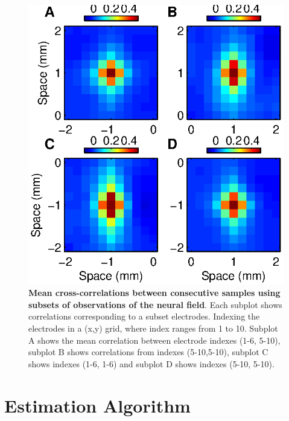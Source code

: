\documentclass[]{article}
\begin{document}
\begin{figure}[!ht]
\begin{center}
\includegraphics{./Figures/HomoTestCrossCorr.eps}
\end{center}
\caption{{\bf Mean cross-correlations between consecutive samples using subsets of observations of the neural field}. Each subplot shows correlations corresponding to a subset electrodes. Indexing the electrodes in a (x,y) grid, where index ranges from 1 to 10. Subplot A shows the mean correlation between electrode indexes (1-6, 5-10), subplot B shows correlations from indexes (5-10,5-10), subplot C shows indexes (1-6, 1-6) and subplot D shows indexes (5-10, 5-10).}
\label{fig:HomogeneityTest}
\end{figure}


\section{Estimation Algorithm}
\end{document}
